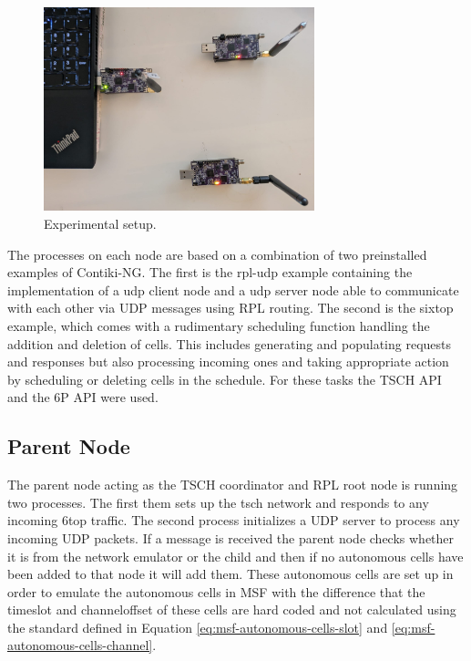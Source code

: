 \documentclass{comnets-thesis}
\begin{document}
\begin{figure}[H]
    \centering
    \includegraphics[width=0.7\textwidth]{./images/Setup photo.jpg}
    \caption{Experimental setup.}
    \label{fig:experimental setup}
\end{figure}

The processes on each node are based on a combination of two preinstalled examples of Contiki-NG. The first is the rpl-udp example containing the implementation of a udp client node and a udp server node able to communicate with each other via UDP messages using RPL routing. The second is the sixtop example, which comes with a rudimentary scheduling function handling the addition and deletion of cells. This includes generating and populating requests and responses but also processing incoming ones and taking appropriate action by scheduling or deleting cells in the schedule. For these tasks the \ac{TSCH} API and the \ac{6P} API were used.

\subsection*{Parent Node}
The parent node acting as the \ac{TSCH} coordinator and \ac{RPL} root node is running two processes. The first them sets up the tsch network and responds to any incoming \ac{6top} traffic. The second process initializes a  \ac{UDP} server to process any incoming \ac{UDP} packets. If a message is received the parent node checks whether it is from the network emulator or the child and then if no autonomous cells have been added to that node it will add them. These autonomous cells are set up in order to emulate the autonomous cells in \ac{MSF} with the difference that the timeslot and channeloffset of these cells are hard coded and not calculated using the standard defined in Equation \ref{eq:msf-autonomous-cells-slot} and \ref{eq:msf-autonomous-cells-channel}.
\end{document}
